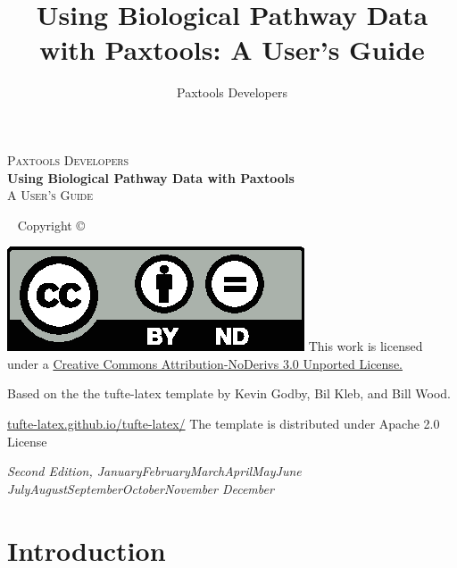 \documentclass{tufte-book}
\title{Using Biological Pathway Data with Paxtools: A User's Guide}
\author[Paxtools Developers]{Paxtools Developers}
\newcommand{\monthyear}{%
\ifcase\month\or January\or February\or March\or April\or May\or June\or
July\or August\or September\or October\or November\or
December\fi\space\number\year
}
\newenvironment{tightcenter}{%
  \setlength\topsep{0pt}
  \setlength\parskip{0pt}
  \begin{center}
}{%
  \end{center}
}
\begin{document}
\begin{titlepage}
\begin{tightcenter}


\textsc{\LARGE Paxtools Developers}\\[5.5cm]



{ \huge \bfseries Using Biological Pathway Data with Paxtools}\\[0.4cm]


\textsc{\Large  A User's Guide}\\[0.5cm]

\end{tightcenter}

\begin{fullwidth}
~\vfill
\thispagestyle{empty}
\setlength{\parindent}{0pt}
\setlength{\parskip}{\baselineskip}
Copyright \copyright\ \the\year\ \thanklessauthor


\par{}

\par \includegraphics[width=\linewidth/10]{by-nd.eps}  This work is licensed under a \href{http://creativecommons.org/licenses/by-nd/3.0/deed.en_US} {Creative Commons Attribution-NoDerivs 3.0 Unported License.} 
\par Based on the the tufte-latex template by Kevin Godby, Bil Kleb, and Bill Wood. 
\par \url{tufte-latex.github.io/tufte-latex/} The template is distributed under Apache 2.0 License
\par\textit{Second Edition, \monthyear}
\end{fullwidth}
\end{titlepage}
\tableofcontents


\cleardoublepage
\chapter*{Introduction}
\end{document}
